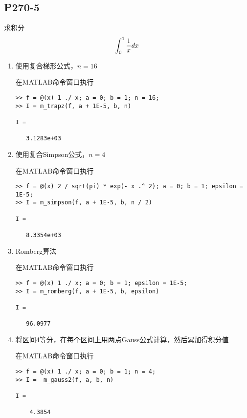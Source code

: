 \subsection{P270-5}

\renewcommand{\FX}{\frac{1}{x}}
\renewcommand{\LRANGE}{0}
\renewcommand{\RRANGE}{1}
\renewcommand{\EPSILON}{{10}^{-5}}

求积分
\begin{displaymath}
\INTRANGE{\FX}{x}
\end{displaymath}

\begin{enumerate}
\item
\renewcommand{\N}{16}
使用复合梯形公式，$n = \N$
\begin{SOLVE}
在MATLAB命令窗口执行
\begin{lstlisting}
>> f = @(x) 1 ./ x; a = 0; b = 1; n = 16;
>> I = m_trapz(f, a + 1E-5, b, n)

I =

   3.1283e+03

\end{lstlisting}
\end{SOLVE}
\item
\renewcommand{\N}{4}
使用复合Simpson公式，$n = \N$
\begin{SOLVE}
在MATLAB命令窗口执行
\begin{lstlisting}
>> f = @(x) 2 / sqrt(pi) * exp(- x .^ 2); a = 0; b = 1; epsilon = 1E-5;
>> I = m_simpson(f, a + 1E-5, b, n / 2)

I =

   8.3354e+03

\end{lstlisting}
\end{SOLVE}
\item
Romberg算法
\begin{SOLVE}
在MATLAB命令窗口执行
\begin{lstlisting}
>> f = @(x) 1 ./ x; a = 0; b = 1; epsilon = 1E-5;
>> I = m_romberg(f, a + 1E-5, b, epsilon)

I =

   96.0977

\end{lstlisting}
\end{SOLVE}
\item
将区间4等分，在每个区间上用两点Gauss公式计算，然后累加得积分值
\begin{SOLVE}
在MATLAB命令窗口执行
\begin{lstlisting}
>> f = @(x) 1 ./ x; a = 0; b = 1; n = 4;
>> I =  m_gauss2(f, a, b, n) 

I =

    4.3854

\end{lstlisting}
\end{SOLVE}

\end{enumerate}
